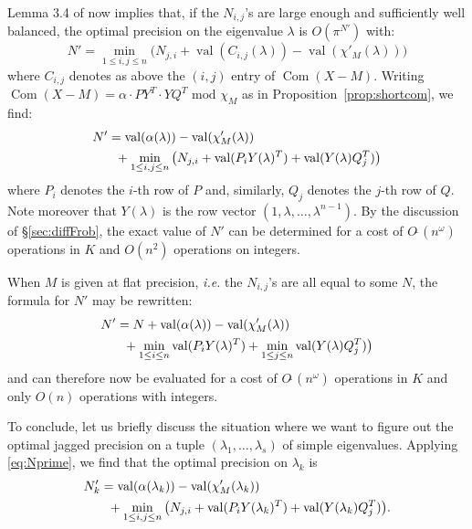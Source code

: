 \documentclass{sig-alternate-05-2015}
\DeclareMathOperator{\val}{val}
\DeclareMathOperator{\com}{Com}
\newcommand{\softO}{O\tilde{~}}
\begin{document}
\noindent
Lemma 3.4 of \cite{caruso-roe-vaccon:14a} now implies that, if the
$N_{i,j}$'s are large enough and sufficiently well balanced, the optimal
precision on the eigenvalue $\lambda$ is $O(\pi^{N'})$ with:
$$N' = \min_{1 \leq i, j\leq n} \big(N_{j,i} + \val(C_{i,j}(\lambda)) - 
\val(\chi'_M(\lambda))\big)$$
where $C_{i,j}$ denotes as above the $(i,j)$ entry of $\com(X{-}M)$.
Writing
$\com(X{-}M) = \alpha \cdot P Y^T \cdot Y Q^T \text{ mod } \chi_M$
as in Proposition~\ref{prop:shortcom}, we find:
\begin{align}
N' & = \val(\alpha(\lambda)) - \val(\chi'_M(\lambda)) \nonumber \\
& \hspace{2mm} + \min_{1 \leq i, j\leq n} \big(N_{j,i} + 
\val(P_i Y(\lambda)^T) + \val(Y(\lambda) Q_j^T)\big) \label{eq:Nprime}
\end{align}
where $P_i$ denotes the $i$-th row of $P$ and, similarly, $Q_j$
denotes the $j$-th row of $Q$. Note moreover that $Y(\lambda)$ is
the row vector $(1, \lambda, \ldots, \lambda^{n-1})$.
By the discussion of \S \ref{sec:diffFrob}, the exact value of $N'$ can be 
determined for a cost of $\softO(n^\omega)$ operations in $K$ and
$O(n^2)$ operations on integers. 

When $M$ is given at flat precision, \emph{i.e.} the $N_{i,j}$'s are all 
equal to some $N$, the formula for $N'$ may be rewritten:
\begin{align}
N' & = N + \val(\alpha(\lambda)) - \val(\chi'_M(\lambda)) \nonumber \\
& \hspace{2mm} + \min_{1 \leq i \leq n} \val(P_i Y(\lambda)^T)
+ \min_{1 \leq j \leq n} \val(Y(\lambda) Q_j^T)\big) \label{eq:Nprimeflat}
\end{align}
and can therefore now be evaluated for a cost of $\softO(n^\omega)$
operations in $K$ and only $O(n)$ operations with integers.

\medskip

To conclude, let us briefly discuss the situation where we want
to figure out the optimal jagged precision on a tuple $(\lambda_1,
\ldots, \lambda_s)$ of simple eigenvalues. Applying \eqref{eq:Nprime},
we find that the optimal precision on $\lambda_k$ is 
\begin{align*}
N'_k & = \val(\alpha(\lambda_k)) - \val(\chi'_M(\lambda_k)) \\
& \hspace{2mm} + \min_{1 \leq i, j\leq n} \big(N_{j,i} + 
\val(P_i Y(\lambda_k)^T) + \val(Y(\lambda_k) Q_j^T)\big).
\end{align*}
\end{document}
